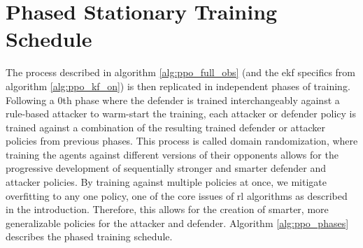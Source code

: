 \section{Phased Stationary Training Schedule}
\label{sec:phased-stationary-training}

The process described in algorithm \ref{alg:ppo_full_obs} (and the \acs{ekf} specifics from algorithm \ref{alg:ppo_kf_on}) is then replicated in independent phases of training. Following a 0th phase where the defender is trained interchangeably against a rule-based attacker to warm-start the training, each attacker or defender policy is trained against a combination of the resulting trained defender or attacker policies from previous phases. This process is called domain randomization, where training the agents against different versions of their opponents allows for the progressive development of sequentially stronger and smarter defender and attacker policies. By training against multiple policies at once, we mitigate overfitting to any one policy, one of the core issues of \acs{rl} algorithms as described in the introduction. Therefore, this allows for the creation of smarter, more generalizable policies for the attacker and defender. Algorithm \ref{alg:ppo_phases} describes the phased training schedule.



